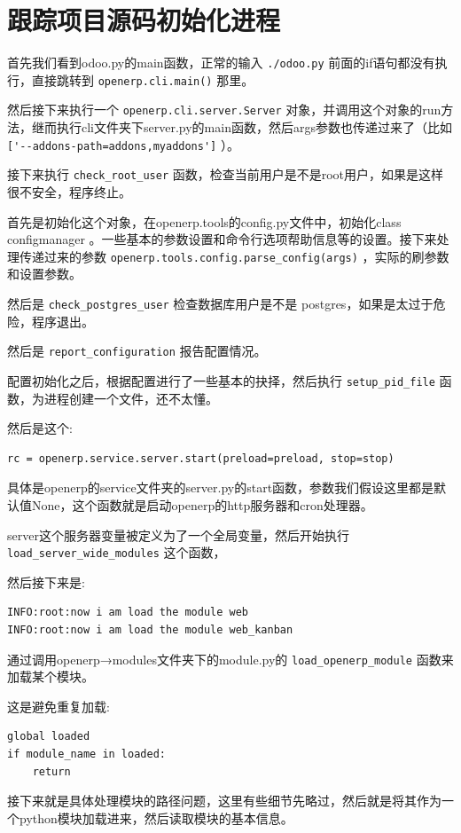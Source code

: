 \documentclass[11pt,a4paper]{sphinxmanual}
\begin{document}
\section{跟踪项目源码初始化进程}
\label{sec-13-4}
首先我们看到odoo.py的main函数，正常的输入 \verb~./odoo.py~ 前面的if语句都没有执行，直接跳转到 \verb~openerp.cli.main()~ 那里。

然后接下来执行一个 \verb~openerp.cli.server.Server~ 对象，并调用这个对象的run方法，继而执行cli文件夹下server.py的main函数，然后args参数也传递过来了（比如 \verb~['--addons-path=addons,myaddons']~ ）。

接下来执行 \verb~check_root_user~ 函数，检查当前用户是不是root用户，如果是这样很不安全，程序终止。

首先是初始化这个对象，在openerp.tools的config.py文件中，初始化class configmanager 。一些基本的参数设置和命令行选项帮助信息等的设置。接下来处理传递过来的参数 \verb~openerp.tools.config.parse_config(args)~ ，实际的刷参数和设置参数。

然后是 \verb~check_postgres_user~ 检查数据库用户是不是 postgres，如果是太过于危险，程序退出。

然后是 \verb~report_configuration~ 报告配置情况。

配置初始化之后，根据配置进行了一些基本的抉择，然后执行 \verb~setup_pid_file~ 函数，为进程创建一个文件，还不太懂。

然后是这个:
\begin{Verbatim}
rc = openerp.service.server.start(preload=preload, stop=stop)
\end{Verbatim}

具体是openerp的service文件夹的server.py的start函数，参数我们假设这里都是默认值None，这个函数就是启动openerp的http服务器和cron处理器。

server这个服务器变量被定义为了一个全局变量，然后开始执行 \verb~load_server_wide_modules~ 这个函数，

然后接下来是:
\begin{Verbatim}
INFO:root:now i am load the module web
INFO:root:now i am load the module web_kanban
\end{Verbatim}

通过调用openerp→modules文件夹下的module.py的 \verb~load_openerp_module~ 函数来加载某个模块。

这是避免重复加载:
\begin{Verbatim}
global loaded
if module_name in loaded:
    return
\end{Verbatim}

接下来就是具体处理模块的路径问题，这里有些细节先略过，然后就是将其作为一个python模块加载进来，然后读取模块的基本信息。
\end{document}
